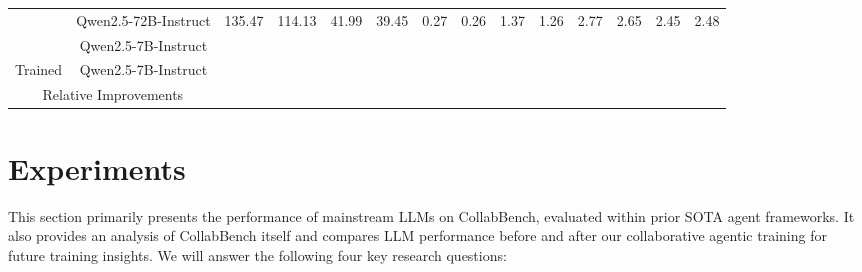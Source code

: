 \documentclass{article}
\theoremstyle{plain}
\theoremstyle{definition}
\theoremstyle{remark}
\begin{document}
\begin{table}[!t]
{\begin{tabular}{cc|cccccc|cccccc}
    \multicolumn{1}{c|}{} & Qwen2.5-72B-Instruct & 135.47 & 114.13 & 41.99 & 39.45 & 0.27  & 0.26  & 1.37  & 1.26  & 2.77  & 2.65  & 2.45  & 2.48  \\
    \multicolumn{1}{c|}{} & Qwen2.5-7B-Instruct &
    \cellcolor{WildStrawberry!25}{86.93}
    & \cellcolor{WildStrawberry!25}{85.87}
    & \cellcolor{WildStrawberry!25}{33.30}
    & \cellcolor{WildStrawberry!25}{33.73}
    & \cellcolor{WildStrawberry!25}{0.23}
    & \cellcolor{WildStrawberry!25}{0.23}
    & \cellcolor{WildStrawberry!25}{0.45}
    & \cellcolor{WildStrawberry!25}{0.53}
    & \cellcolor{WildStrawberry!25}{1.92}
    & \cellcolor{WildStrawberry!25}{1.87}
    & \cellcolor{WildStrawberry!25}{1.86}
    &                                                                                                                                                                                                   \cellcolor{WildStrawberry!25}{1.88}
    \\
    \midrule
    \multicolumn{1}{c|}{Trained} & Qwen2.5-7B-Instruct & 
    \cellcolor{WildStrawberry!25}{99.20}  
    & \cellcolor{WildStrawberry!25}{102.40}  
    & \cellcolor{WildStrawberry!25}{34.03}  
    & \cellcolor{WildStrawberry!25}{34.76}  
    & \cellcolor{WildStrawberry!25}{0.23}  
    & \cellcolor{WildStrawberry!25}{0.22}  
    & \cellcolor{WildStrawberry!25}{0.74}  
    & \cellcolor{WildStrawberry!25}{0.55}  
    & \cellcolor{WildStrawberry!25}{2.26}  
    & \cellcolor{WildStrawberry!25}{1.99}  
    & \cellcolor{WildStrawberry!25}{2.12}  
    & \cellcolor{WildStrawberry!25}{2.08}
    \\
    \midrule
    \multicolumn{2}{c|}{Relative Improvements} & \cellcolor{Red}{14.1\%}
    & \cellcolor{Red}{19.3\%}
    & \cellcolor{Red}{-2.2\%}
    & \cellcolor{Red}{-3.1\%}
    & \cellcolor{Red}{0.0\%}
    & \cellcolor{Red}{4.3\%}
    & \cellcolor{Red}{62.7\%}
    & \cellcolor{Red}{4.6\%}
    & \cellcolor{Red}{17.7\%}
    & \cellcolor{Red}{6.5\%}
    & \cellcolor{Red}{14.0\%}
    & \cellcolor{Red}{10.4\%}
     \\
    \bottomrule
    \end{tabular}%
}
  \vspace{-1em}
  \label{tab:main}%
\end{table}%







\section{Experiments}
This section primarily presents the performance of mainstream LLMs on CollabBench, evaluated within prior SOTA agent frameworks. It also provides an analysis of CollabBench itself and compares LLM performance before and after our collaborative agentic training for future training insights. We will answer the following four key research questions:
\end{document}
